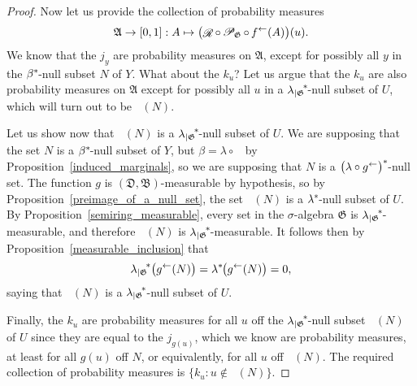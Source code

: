 \documentclass[
twoside=true,
paper=letter,
fontsize=9pt,
pagesize=auto,
leqno,
openany,
headsepline,
overfullrule,
]{scrbook}
\theoremstyle{plain}
\theoremstyle{plain}
\theoremstyle{definition}
\theoremstyle{bfnoteitalic}
\theoremstyle{bfnoteroman}
\newcommand{\sigalg}[1]{\mathfrak{#1}}
\newcommand{\cali}[1]{\mathscr{#1}}
\newcommand{\condprobop}[1]{\mathop{\cali{P}\hspace{-1pt}}\nolimits_{#1}}
\newcommand{\textsigma}{\hbox{\large{$\sigma$}}\kern-1pt}
\newcommand{\restrictedto}[1]{_{\lvert#1}\kern-1.5pt}
\newcommand{\preimage}[1]{\mathop{#1^{\leftarrow}}}
\newcommand{\sigmaalgebra}{\sigalg{A}}
\newcommand{\sigmaalgebraii}{\sigalg{B}}
\newcommand{\kernast}{\ast\kern-1pt}
\newcommand{\funcg}{g}
\newcommand{\funcj}{j}
\newcommand{\funck}{k}
\newcommand{\function}{f}
\newcommand{\measurespaceii}{Y}
\newcommand{\mspaceeltii}{y}
\newcommand{\measlambda}{\lambda}
\newcommand{\seti}{A}
\newcommand{\regular}{\mathop{\cali{R}}}
\newcommand{\uspace}{U}%
\newcommand{\uspaceelt}{u}
\newcommand{\uspacesig}{\sigalg{D}}
\newcommand{\marginaltwo}{\beta}%
\begin{document}
\begin{proof}
Now let us provide the collection of probability measures
\[
\sigmaalgebra\to [0,1]: \seti \mapsto
\bigl( \regular\circ\condprobop{\sigalg{G}} \circ\preimage{\function}
(\seti)\bigr)(\uspaceelt).
\]
We know that the $\funcj_\mspaceeltii$ are probability measures on $\sigmaalgebra$, except for possibly all
$\mspaceeltii$ in the $\marginaltwo^\kernast$\hyp{}null subset $N$ of $\measurespaceii$.  What about the
$\funck_\uspaceelt$?  Let us argue that the $\funck_\uspaceelt$ are also probability measures on $\sigmaalgebra$ except for possibly all $\uspaceelt$ in a
${\measlambda\restrictedto{\sigalg{G}}}^\kernast$\hyp{}null subset of $\uspace$,
which will turn out to be $\preimage{\funcg}(N)$.

Let us show now that  $\preimage{\funcg}(N)$ is a
${\measlambda\restrictedto{\sigalg{G}}}^\kernast$\hyp{}null subset of $\uspace$.
We are supposing that the set
$N$ is a
$\marginaltwo^\kernast$\hyp{}null subset of $\measurespaceii$,
but
$\marginaltwo = \measlambda \circ \preimage{\funcg}$ by Proposition~\ref{induced_marginals}, so
we are supposing that $N$ is a
$\bigl(\measlambda\circ\preimage{\funcg}\bigr)^\kernast$\hyp{}null set.
The function
$\funcg$ is $(\uspacesig,\sigmaalgebraii)$\hyp{}measurable by hypothesis,
so by Proposition~\ref{preimage_of_a_null_set}, the set
$\preimage{\funcg}(N)$ is a $\measlambda^\kernast$\hyp{}null subset of $\uspace$.
By Proposition~\ref{semiring_measurable}, every set in the \textsigma\hyp{}algebra $\sigalg{G}$ is
${\measlambda\restrictedto{\sigalg{G}}}^\kernast$\hyp{}measurable, and therefore
$\preimage{\funcg}(N)$ is ${\measlambda\restrictedto{\sigalg{G}}}^\kernast$\hyp{}measurable.
It follows then by Proposition~\ref{measurable_inclusion} that
\[
{\measlambda\restrictedto{\sigalg{G}}}^* \bigl(\preimage{\funcg}(N)\bigr)
=
\lambda^\kernast\bigl(\preimage{\funcg}(N)\bigr)
= 0,
\]
saying that
$\preimage{\funcg}(N)$ is a
${\measlambda\restrictedto{\sigalg{G}}}^\kernast$\hyp{}null subset of $\uspace$.

Finally, the $\funck_\uspaceelt$ are probability measures for all $\uspaceelt$ off the
${\measlambda\restrictedto{\sigalg{G}}}^\kernast$\hyp{}null subset
$\preimage{\funcg}(N)$
of $\uspace$
since they are equal to the
$\funcj_{\funcg(\uspaceelt)}$, which we know are probability measures, at least for all
$\funcg(\uspaceelt)$ off $N$, or equivalently, for all $\uspaceelt$ off
$\preimage{\funcg}(N)$.
The required collection of probability measures is
$\{ \funck_\uspaceelt : \uspaceelt\notin \preimage{\funcg}(N) \}$.


\end{proof}
\end{document}
